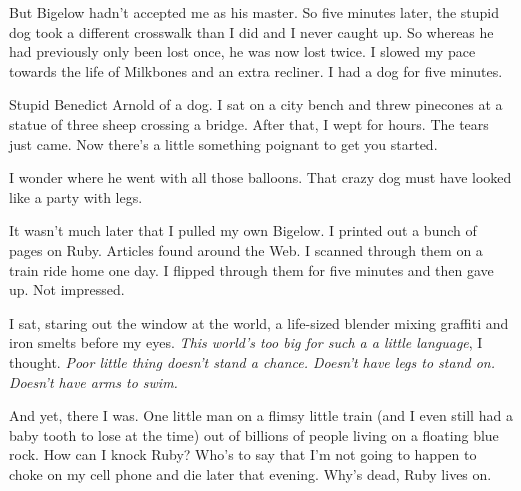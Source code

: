 \documentclass[10pt,twoside]{report}
\begin{document}
But Bigelow hadn't accepted me as his master.  So five minutes later,
the stupid dog took a different crosswalk than I did and I never
caught up.  So whereas he had previously only been lost once, he was
now lost twice.  I slowed my pace towards the life of Milkbones and an
extra recliner.  I had a dog for five minutes.

Stupid Benedict Arnold of a dog.  I sat on a city bench and threw
pinecones at a statue of three sheep crossing a bridge.  After that, I
wept for hours.  The tears just came.  Now there's a little something
poignant to get you started.

I wonder where he went with all those balloons.  That crazy dog must
have looked like a party with legs.

It wasn't much later that I pulled my own Bigelow.  I printed out a
bunch of pages on Ruby.  Articles found around the Web.  I scanned
through them on a train ride home one day.  I flipped through them for
five minutes and then gave up.  Not impressed.

I sat, staring out the window at the world, a life-sized blender
mixing graffiti and iron smelts before my eyes.  {\em This world's too
  big for such a a little language}, I thought. {\em Poor little thing
  doesn't stand a chance.  Doesn't have legs to stand on.  Doesn't
  have arms to swim.}

And yet, there I was.  One little man on a flimsy little train (and I
even still had a baby tooth to lose at the time) out of billions of
people living on a floating blue rock.  How can I knock Ruby?  Who's
to say that I'm not going to happen to choke on my cell phone and die
later that evening.  Why's dead, Ruby lives on.
\end{document}
